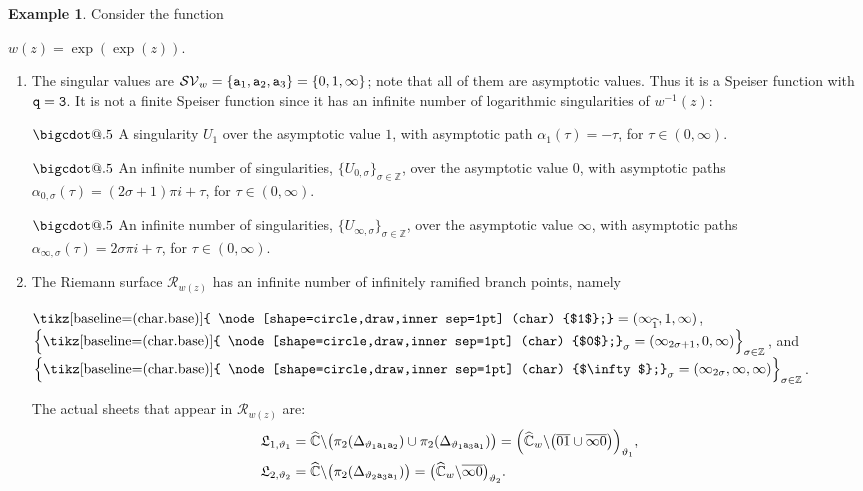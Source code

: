 \documentclass[final,3p,times]{elsarticle}
\makeatletter
\newcommand{\ZZ}{\ensuremath{{\mathbb Z}}}
\newcommand{\CW}{\ensuremath{{\widehat{\mathbb C}}}}
\newcommand{\R}{\ensuremath{{\mathcal R}}}
\newcommand{\circled}[1]{ \text{\tikz[baseline=(char.base)]{
    \node[shape=circle,draw,inner sep=1pt] (char) {$#1$};}} }
\newcommand*\bigcdot{\mathpalette\bigcdot@{.5}}
\newcommand*\bigcdot@[2]{\mathbin{\vcenter{\hbox{\scalebox{#2}{$\m@th#1\bullet$}}}}}
\theoremstyle{definition}
\newtheorem{example}{Example}[section]
\makeatother
\begin{document}
\begin{example}
\label{example:exp-exp}
Consider the function 

\centerline{$w(z)=\exp(\exp(z))$.}


\begin{enumerate}[label=\alph*),leftmargin=*]
\item 
The singular values are $\mathcal{SV}_w = \{ {\tt a}_1, {\tt a}_2, {\tt a}_3 \} =\{0,1,\infty\}$; 
note that all of them are asymptotic values.
Thus it is a Speiser function with $\tt q = 3$.
It is not a finite Speiser function since it has an infinite number of logarithmic singularities of $w^{-1}(z)$:

\noindent
$\bigcdot$
A singularity $ U_1$ over the asymptotic value $1$, 
with asymptotic path $\alpha_1(\tau) = -\tau$, for $\tau\in(0,\infty)$. 

\noindent
$\bigcdot$
An infinite number of singularities, 
$\{ U_{0, \sigma} \}_{\sigma \in \ZZ}$, over the asymptotic value $0$, 
with asymptotic paths $\alpha_{0, \sigma}(\tau) = (2\sigma+1) \pi i + \tau$, for $\tau\in(0,\infty)$. 

\noindent
$\bigcdot$
An infinite number of singularities, 
$\{ U_{\infty, \sigma} \}_{\sigma \in \ZZ}$, over the asymptotic value $\infty$,
with asymptotic paths $\alpha_{\infty, \sigma}(\tau) = 2\sigma \pi i + \tau$, for $\tau\in(0,\infty)$.

\item
The Riemann surface $\R_{w(z)}$
has an infinite number of infinitely ramified branch points, namely

\centerline{
$\circled{1}=(\infty_{\widehat{1}}, 1,\infty)$, 
$\Big\{\circled{0}_\sigma = (\infty_{2\sigma+1}, 0, \infty) \Big\}_{\sigma \in \ZZ}$, and
$\Big\{\circled{\infty}_\sigma = (\infty_{2\sigma}, \infty, \infty) \Big\}_{\sigma \in \ZZ}$.}

\noindent
The actual sheets that appear in $\R_{w(z)}$ are:
\begin{align*}
\mathfrak{L}_{1,\vartheta_1} &= \CW\backslash \big( \pi_2 (\Delta_{\vartheta_1 {\tt a}_1 {\tt a}_2}  )
\cup \pi_2 (\Delta_{\vartheta_1 {\tt a}_3 {\tt a}_1}  )
 \big)
= \Big( \CW_w \backslash \big( \overline{01} \cup \overline{ \infty 0} \big) \Big)_{\vartheta_1},
\\
%
\mathfrak{L}_{2,\vartheta_2} &= \CW\backslash \big( \pi_2 (\Delta_{\vartheta_2 {\tt a}_3 {\tt a}_1} ) \big)
= \big( \CW_w \backslash  \overline{\infty 0} \big)_{\vartheta_2}.
\end{align*}



\end{enumerate}
\end{example}
\end{document}
